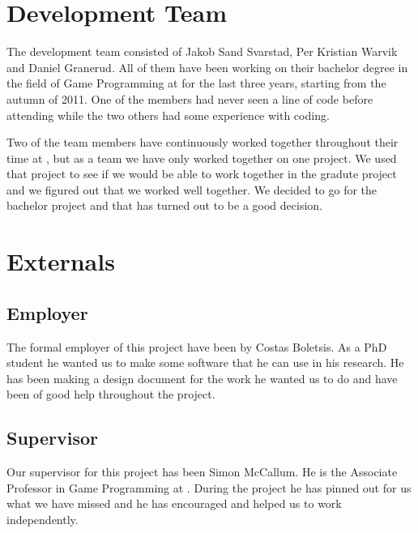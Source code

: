 \section{Development Team}
The development team consisted of Jakob Sand Svarstad, Per Kristian Warvik and Daniel Granerud.
All of them have been working on their bachelor degree in the field of Game Programming at \GUC{} for the last three years, starting from the autumn of 2011. One of the members had never seen a line of code before attending \GUC{} while the two others had some experience with coding.

Two of the team members have continuously worked together throughout their time at \GUC{}, but as a team we have only worked together on one project. We used that project to see if we would be able to work together in the gradute project and we figured out that we worked well together. We decided to go for the bachelor project and that has turned out to be a good decision.

\section{Externals}

\subsection{Employer}
The formal employer of this project have been \GUC{} by Costas Boletsis. As a PhD student he wanted us to make some software that he can use in his research. He has been making a design document for the work he wanted us to do and have been of good help throughout the project.

\subsection{Supervisor}
Our supervisor for this project has been Simon McCallum. He is the Associate Professor in Game Programming at \GUC{}. During the project he has pinned out for us what we have missed and he has encouraged and helped us to work independently.
